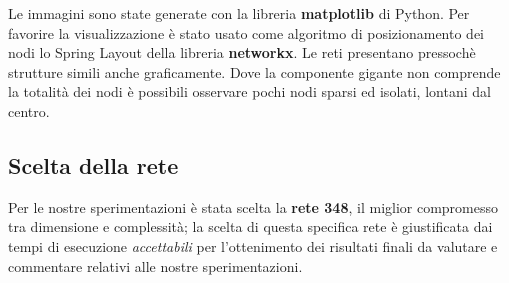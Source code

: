 Le immagini sono state generate con la libreria \textbf{matplotlib} di Python. Per favorire la visualizzazione è stato usato come algoritmo di posizionamento dei nodi lo Spring Layout della libreria \textbf{networkx}. Le reti presentano pressochè strutture simili anche graficamente. Dove la componente gigante non comprende la totalità dei nodi è possibili osservare pochi nodi sparsi ed isolati, lontani dal centro.

\subsection{Scelta della rete}

Per le nostre sperimentazioni è stata scelta la \textbf{rete 348}, il miglior compromesso tra dimensione e complessità; la scelta di questa specifica rete è giustificata dai tempi di esecuzione \textit{accettabili} per l'ottenimento dei risultati finali da valutare e commentare relativi alle nostre sperimentazioni.